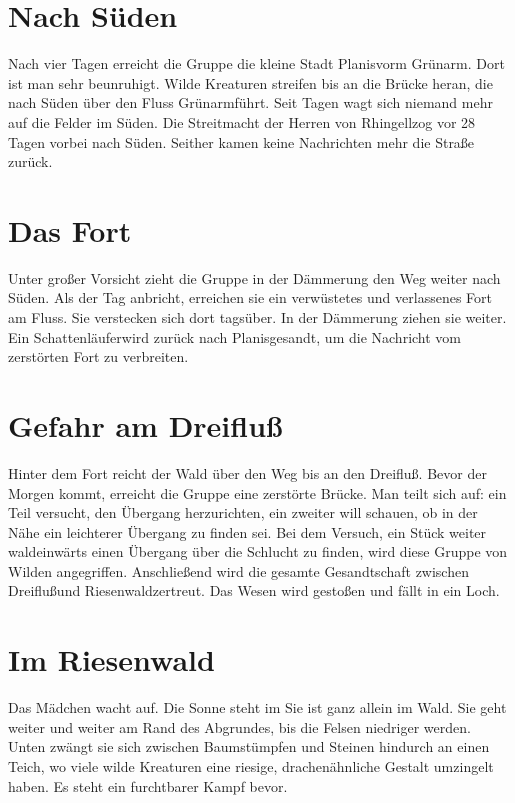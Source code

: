\documentclass[12pt,a4paper,onecolumn,twoside,ngerman]{book}
\newcommand{\Schattenlaufer}{Schattenläufer}
\newcommand{\Rhingell}{Rhingell}
\newcommand{\Dreifluss}{Dreifluß}
\newcommand{\Planis}{Planis}
\newcommand{\Grunarm}{Grünarm}
\newcommand{\Grunland}{Grünland}
\newcommand{\Riesenwald}{Riesenwald}
\begin{document}
\section{Nach Süden}
Nach vier Tagen erreicht die Gruppe die kleine Stadt \Planis vorm \Grunarm. Dort ist man sehr beunruhigt. Wilde Kreaturen streifen bis an die Brücke heran, die nach Süden über den Fluss \Grunarm führt. Seit Tagen wagt sich niemand mehr auf die Felder im Süden. Die Streitmacht der Herren von \Rhingell zog vor 28 Tagen vorbei nach Süden. Seither kamen keine Nachrichten mehr die Straße zurück.
 
\section{Das Fort}
Unter großer Vorsicht zieht die Gruppe in der Dämmerung den Weg weiter nach Süden. Als der Tag anbricht, erreichen sie ein verwüstetes und verlassenes Fort am Fluss. Sie verstecken sich dort tagsüber. In der Dämmerung ziehen sie weiter. Ein \Schattenlaufer wird zurück nach \Planis gesandt, um die Nachricht vom zerstörten Fort zu verbreiten.

\section{Gefahr am \Dreifluss}
Hinter dem Fort reicht der Wald über den Weg bis an den \Dreifluss. Bevor der Morgen kommt, erreicht die Gruppe eine zerstörte Brücke. Man teilt sich auf: ein Teil versucht, den Übergang herzurichten, ein zweiter will schauen, ob in der Nähe ein leichterer Übergang zu finden sei. Bei dem Versuch, ein Stück weiter waldeinwärts einen Übergang über die Schlucht zu finden, wird diese Gruppe von Wilden angegriffen. Anschließend wird die gesamte Gesandtschaft zwischen \Dreifluss und \Riesenwald zertreut. Das Wesen wird gestoßen und fällt in ein Loch.

\section{Im \Riesenwald}
Das Mädchen wacht auf. Die Sonne steht im Sie ist ganz allein im Wald. Sie geht weiter und weiter am Rand des Abgrundes, bis die Felsen niedriger werden. Unten zwängt sie sich zwischen Baumstümpfen und Steinen hindurch an einen Teich, wo viele wilde Kreaturen eine riesige, drachenähnliche Gestalt umzingelt haben. Es steht ein furchtbarer Kampf bevor.
\end{document}
